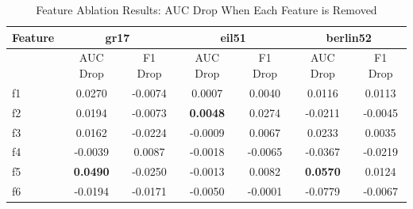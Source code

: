 \documentclass[10pt,twoside]{article}
\numberwithin{equation}{section}
\begin{document}


	


	\begin{table}[htbp]


		\centering


		\caption{Feature Ablation Results: AUC Drop When Each Feature is Removed}


		\label{tab:feature_ablation_compact}


		\begin{tabular}{l|cc|cc|cc} \hline


		Feature & \multicolumn{2}{c}{gr17} & \multicolumn{2}{c}{eil51} & \multicolumn{2}{c}{berlin52} \\ \hline


			& {AUC Drop} & {F1 Drop} & {AUC Drop} & {F1 Drop} & {AUC Drop} & {F1 Drop} \\ \hline


			f1 & 0.0270 & -0.0074 & 0.0007 & 0.0040 & 0.0116 & 0.0113 \\


			f2 & 0.0194 & -0.0073 & \textbf{0.0048} & 0.0274 & -0.0211 & -0.0045 \\


			f3 & 0.0162 & -0.0224 & -0.0009 & 0.0067 & 0.0233 & 0.0035 \\


			f4 & -0.0039 & 0.0087 & -0.0018 & -0.0065 & -0.0367 & -0.0219 \\


			f5 & \textbf{0.0490} & -0.0250 & -0.0013 & 0.0082 & \textbf{0.0570} & 0.0124 \\


			f6 & -0.0194 & -0.0171 & -0.0050 & -0.0001 & -0.0779 & -0.0067 \\ \hline


			\end{tabular}


	\end{table}


	


	


	
\end{document}
